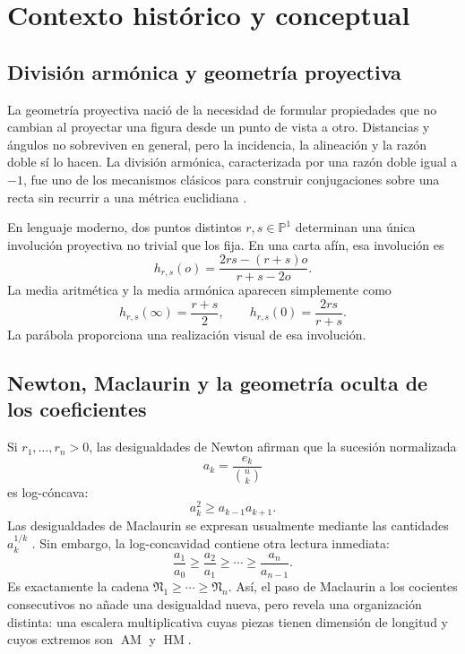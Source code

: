 \documentclass[11pt,oneside]{scrartcl}
\theoremstyle{plainblue}
\theoremstyle{definitionblue}
\theoremstyle{remarkgray}
\newcommand{\PP}{\mathbb{P}}
\newcommand{\AM}{\operatorname{AM}}
\newcommand{\HM}{\operatorname{HM}}
\newcommand{\cN}{\mathfrak{N}}
\begin{document}
\section{Contexto histórico y conceptual}

\subsection{División armónica y geometría proyectiva}

La geometría proyectiva nació de la necesidad de formular propiedades que no
cambian al proyectar una figura desde un punto de vista a otro. Distancias y ángulos
no sobreviven en general, pero la incidencia, la alineación y la razón doble sí lo
hacen. La división armónica, caracterizada por una razón doble igual a \(-1\), fue
uno de los mecanismos clásicos para construir conjugaciones sobre una recta sin
recurrir a una métrica euclidiana \cite{Coxeter,Berger}.

En lenguaje moderno, dos puntos distintos \(r,s\in\PP^1\) determinan una única
involución proyectiva no trivial que los fija. En una carta afín, esa involución es
\[
h_{r,s}(o)=\frac{2rs-(r+s)o}{r+s-2o}.
\]
La media aritmética y la media armónica aparecen simplemente como
\[
h_{r,s}(\infty)=\frac{r+s}{2},
\qquad
h_{r,s}(0)=\frac{2rs}{r+s}.
\]
La parábola proporciona una realización visual de esa involución.

\subsection{Newton, Maclaurin y la geometría oculta de los coeficientes}

Si \(r_1,\dots,r_n>0\), las desigualdades de Newton afirman que la sucesión
normalizada
\[
a_k=\frac{e_k}{\binom nk}
\]
es log-cóncava:
\[
a_k^2\ge a_{k-1}a_{k+1}.
\]
Las desigualdades de Maclaurin se expresan usualmente mediante las cantidades
\(a_k^{1/k}\) \cite{HardyLittlewoodPolya,MarshallOlkinArnold}. Sin embargo, la log-concavidad contiene otra lectura inmediata:
\[
\frac{a_1}{a_0}\ge \frac{a_2}{a_1}\ge\cdots\ge\frac{a_n}{a_{n-1}}.
\]
Es exactamente la cadena \(\cN_1\ge\cdots\ge\cN_n\). Así, el paso de Maclaurin a
los cocientes consecutivos no añade una desigualdad nueva, pero revela una
organización distinta: una escalera multiplicativa cuyas piezas tienen dimensión de
longitud y cuyos extremos son \(\AM\) y \(\HM\).
\end{document}
